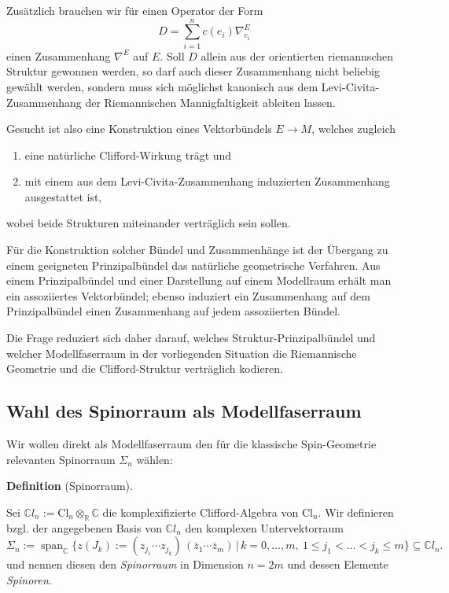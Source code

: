 \documentclass[10pt, letterpaper]{article}
\newcommand{\R}{\mathbb{R}}
\newcommand{\C}{\mathbb{C}}
\newcommand{\Cl}{\mathrm{Cl}}
\newcommand{\CustomHeading}[3]{%
  \par\medskip\noindent%
  \textbf{#1 #2} \textnormal{(#3)}.\enskip%
}
\newenvironment{DEF}[2]{\CustomHeading{Definition}{#1}{#2}}{}
\begin{document}
Zusätzlich brauchen wir für einen Operator der Form
\[
D=\sum_{i=1}^n c(e_i)\nabla^E_{e_i}
\]
einen Zusammenhang $\nabla^E$ auf \(E\). Soll \(D\) allein aus
der orientierten riemannschen Struktur gewonnen werden, so darf auch dieser
Zusammenhang nicht beliebig gewählt werden, sondern muss sich möglichst
kanonisch aus dem Levi-Civita-Zusammenhang der Riemannischen Mannigfaltigkeit ableiten lassen. 


Gesucht ist also eine Konstruktion eines Vektorbündels \(E\to M\), welches zugleich

\begin{enumerate}
\item eine natürliche Clifford-Wirkung trägt und
\item mit einem aus dem Levi-Civita-Zusammenhang induzierten Zusammenhang
      ausgestattet ist,
\end{enumerate}

wobei beide Strukturen miteinander verträglich sein sollen.




Für die Konstruktion solcher Bündel und Zusammenhänge ist der Übergang zu
einem geeigneten Prinzipalbündel das natürliche geometrische Verfahren.
Aus einem Prinzipalbündel und einer Darstellung auf einem Modellraum erhält
man ein assoziiertes Vektorbündel; ebenso induziert ein Zusammenhang auf dem
Prinzipalbündel einen Zusammenhang auf jedem assoziierten Bündel. 

Die Frage reduziert sich daher darauf, welches Struktur-Prinzipalbündel und welcher
Modellfaserraum in der vorliegenden Situation die Riemannische Geometrie und
die Clifford-Struktur verträglich kodieren.





\subsection{Wahl des Spinorraum als Modellfaserraum}

Wir wollen direkt als Modellfaserraum den für die klassische Spin-Geometrie relevanten Spinorraum $\Sigma_n$ wählen:

\begin{DEF}{}{Spinorraum}
Sei $\C l_n:=\Cl_n\otimes_{\R}\C$ die komplexifizierte Clifford-Algebra von $\Cl_n$. Wir definieren bzgl. der angegebenen Basis von $\C l_n$ den komplexen Untervektorraum
\[
\Sigma_n:=
\operatorname{span}_{\C}\bigl\{
z(J_k):=\left(z_{j_1}\cdots z_{j_k}\right)\,\left(\bar z_1\cdots \bar z_m\right)\,\big|\,
k=0,\dots,m,\ 1\le j_1<\dots<j_k\le m
\bigr\}
\subseteq \C l_n.
\]
und nennen diesen den \emph{Spinorraum} in Dimension $n=2m$ und dessen Elemente \emph{Spinoren}.
\end{DEF}
\end{document}
